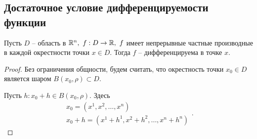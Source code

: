 \subsection{Достаточное условие дифференцируемости функции}

\begin{theorem}
    Пусть $ D $ -- область в $ \R^n, \ f:D \rightarrow\R, \ f $ имеет непрерывные частные производные в каждой окрестности точки $ x\in D $. Тогда $ f $ -- дифференцируема в точке $ x $.
\end{theorem}

\begin{proof}
    Без ограничения общности, будем считать, что окрестность точки $ x_0\in D $ является шаром $ B(x_0,\rho)\subset D $.

    Пусть $ h:x_0+h \in B(x_0,\rho) $. Здесь
    \[
        \begin{array}{l}
            x_0 = (x^1,x^2,\ldots,x^n) \\
            x_0 + h = (x^1 + h^1,x^2 + h^2,\ldots,x^n+h^n)
        \end{array}.
    \]


\end{proof}
